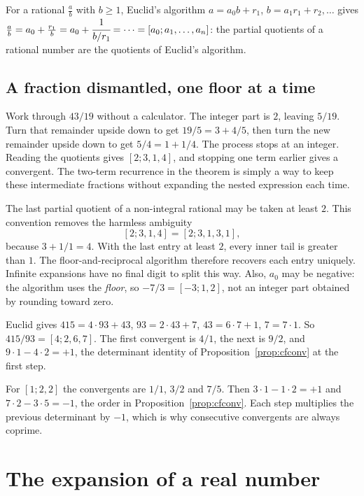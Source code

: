 For a rational $\frac ab$ with $b\ge1$, Euclid's algorithm $a=a_0b+r_1$, $b=a_1r_1+r_2,\dots$ gives $\frac ab=a_0+\frac{r_1}b=a_0+\cfrac1{b/r_1}=\cdots=[a_0;a_1,\dots,a_n]$: the partial quotients of a rational number are the quotients of Euclid's algorithm.

\subsection*{A fraction dismantled, one floor at a time}
Work through $43/19$ without a calculator. The integer part is $2$, leaving $5/19$. Turn that remainder upside down to get $19/5=3+4/5$, then turn the new remainder upside down to get $5/4=1+1/4$. The process stops at an integer. Reading the quotients gives $[2;3,1,4]$, and stopping one term earlier gives a convergent. The two-term recurrence in the theorem is simply a way to keep these intermediate fractions without expanding the nested expression each time.

The last partial quotient of a non-integral rational may be taken at least $2$. This convention removes the harmless ambiguity
\[
[2;3,1,4]=[2;3,1,3,1],
\]
because $3+1/1=4$. With the last entry at least $2$, every inner tail is greater than $1$. The floor-and-reciprocal algorithm therefore recovers each entry uniquely. Infinite expansions have no final digit to split this way. Also, $a_0$ may be negative: the algorithm uses the \emph{floor}, so $-7/3=[-3;1,2]$, not an integer part obtained by rounding toward zero.

\begin{examplex}
Euclid gives $415=4\cdot 93+43$, $93=2\cdot 43+7$, $43=6\cdot 7+1$, $7=7\cdot 1$. So $415/93=[4;2,6,7]$. The first convergent is $4/1$, the next is $9/2$, and $9\cdot 1-4\cdot 2=+1$, the determinant identity of Proposition~\ref{prop:cfconv} at the first step.
\end{examplex}

\begin{examplex}
For $[1;2,2]$ the convergents are $1/1$, $3/2$ and $7/5$. Then $3\cdot 1-1\cdot 2=+1$ and $7\cdot 2-3\cdot 5=-1$, the order in Proposition~\ref{prop:cfconv}. Each step multiplies the previous determinant by $-1$, which is why consecutive convergents are always coprime.
\end{examplex}

\section{The expansion of a real number}


